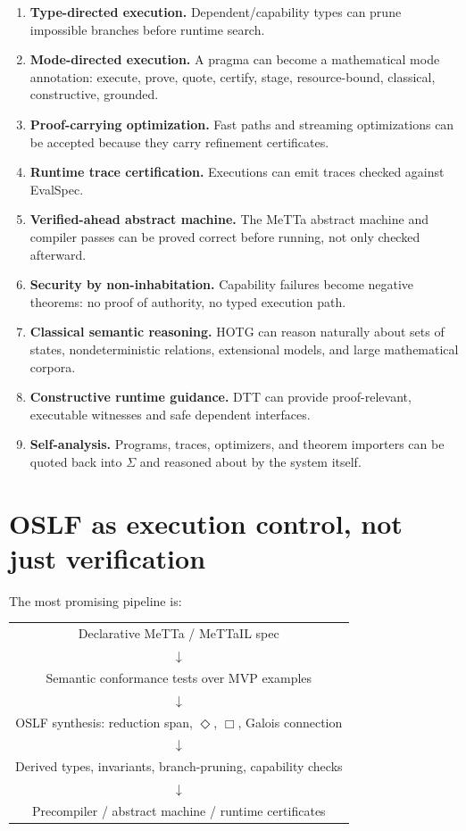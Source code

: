 \documentclass[11pt]{article}
\newcommand{\MeTTa}{\textup{MeTTa}}
\newcommand{\MeTTaIL}{\textup{MeTTaIL}}
\begin{document}
\begin{enumerate}
\item \textbf{Type-directed execution.}  Dependent/capability types can prune impossible branches before runtime search.
\item \textbf{Mode-directed execution.}  A pragma can become a mathematical mode annotation: execute, prove, quote, certify, stage, resource-bound, classical, constructive, grounded.
\item \textbf{Proof-carrying optimization.}  Fast paths and streaming optimizations can be accepted because they carry refinement certificates.
\item \textbf{Runtime trace certification.}  Executions can emit traces checked against EvalSpec.
\item \textbf{Verified-ahead abstract machine.}  The \MeTTa{} abstract machine and compiler passes can be proved correct before running, not only checked afterward.
\item \textbf{Security by non-inhabitation.}  Capability failures become negative theorems: no proof of authority, no typed execution path.
\item \textbf{Classical semantic reasoning.}  HOTG can reason naturally about sets of states, nondeterministic relations, extensional models, and large mathematical corpora.
\item \textbf{Constructive runtime guidance.}  DTT can provide proof-relevant, executable witnesses and safe dependent interfaces.
\item \textbf{Self-analysis.}  Programs, traces, optimizers, and theorem importers can be quoted back into \(\Sigma\) and reasoned about by the system itself.
\end{enumerate}

\section{OSLF as execution control, not just verification}

The most promising pipeline is:

\begin{center}
\begin{tabular}{c}
Declarative \MeTTa{} / \MeTTaIL{} spec \\
\(\downarrow\) \\
Semantic conformance tests over MVP examples \\
\(\downarrow\) \\
OSLF synthesis: reduction span, \(\Diamond\), \(\Box\), Galois connection \\
\(\downarrow\) \\
Derived types, invariants, branch-pruning, capability checks \\
\(\downarrow\) \\
Precompiler / abstract machine / runtime certificates
\end{tabular}
\end{center}
\end{document}
